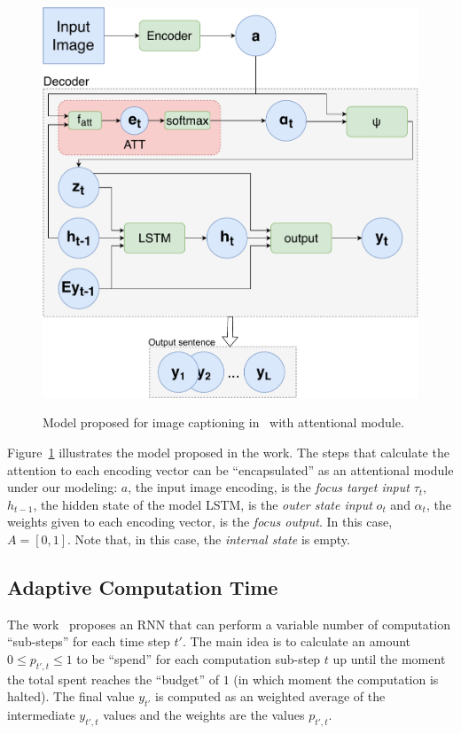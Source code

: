 \documentclass[7pt]{article}
\begin{document}
\begin{figure}[H]
    \centering
    \includegraphics[width=0.6\linewidth]{./img/captioning.pdf}
    \label{fig:captioning}
    \caption{Model proposed for image captioning in~\cite{ref:show-attend-tell} with attentional module.}
\end{figure}

Figure~\ref{fig:captioning} illustrates the model proposed in the work.
The steps that calculate the attention to each encoding vector can be ``encapsulated'' as
an attentional module under our modeling:
$a$, the input image encoding, is the \emph{focus target input} $\tau_t$,
$h_{t-1}$, the hidden state of the model LSTM, is the \emph{outer state input} $o_t$
and $\alpha_t$, the weights given to each encoding vector, is the \emph{focus output}. In this case, $A = [0, 1]$.
Note that, in this case, the \emph{internal state} is empty.

\subsection{Adaptive Computation Time}
The work~\cite{ref:act} proposes an RNN that can perform a variable number of computation ``sub-steps'' for each time step $t'$.
The main idea is to calculate an amount $0 \le p_{t',t} \le 1$ to be ``spend'' for each computation sub-step $t$ up until the
moment the total spent reaches the ``budget'' of $1$ (in which moment the computation is halted).
The final value $y_{t'}$ is computed as an weighted average of the intermediate $y_{t',t}$ values and the weights are the values
$p_{t',t}$.
\end{document}

